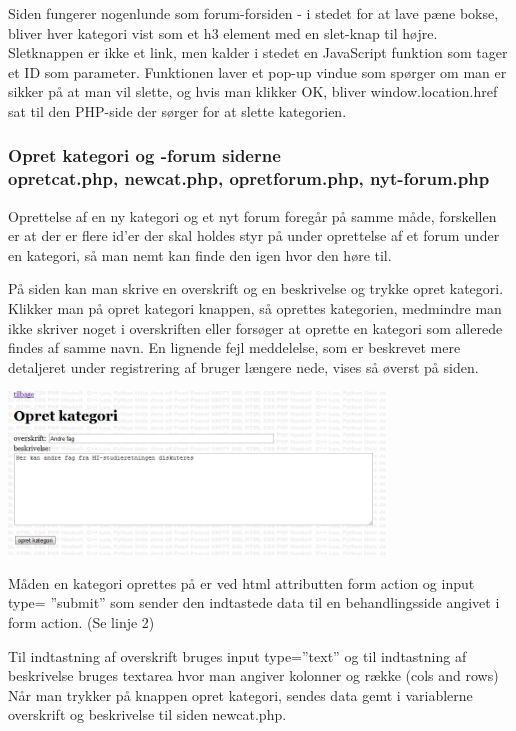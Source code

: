 \documentclass{article}
\begin{document}
Siden fungerer nogenlunde som forum-forsiden - i stedet for at lave pæne bokse, bliver hver kategori vist som et h3 element med en slet-knap til højre. Sletknappen er ikke et link, men kalder i stedet en JavaScript funktion som tager et ID som parameter. Funktionen laver et pop-up vindue som spørger om man er sikker på at man vil slette, og hvis man klikker OK, bliver window.location.href sat til den PHP-side der sørger for at slette kategorien.



\subsubsection[Opret kategori og -forum siderne]{Opret kategori og -forum siderne \\opretcat.php, newcat.php, opretforum.php, nyt-forum.php}
Oprettelse af en ny kategori og et nyt forum foregår på samme måde, forskellen er at der er flere id’er der skal holdes styr på under oprettelse af et forum under en kategori, så man nemt kan finde den igen hvor den høre til.

På siden kan man skrive en overskrift og en beskrivelse og trykke opret kategori. Klikker man på opret kategori knappen, så oprettes kategorien, medmindre man ikke skriver noget i overskriften eller forsøger at oprette en kategori som allerede findes af samme navn. En lignende fejl meddelelse, som er beskrevet mere detaljeret under registrering af bruger længere nede, vises så øverst på siden.

\includegraphics[width=100mm]{mi18.png}

Måden en kategori oprettes på er ved html attributten form action og input type= ”submit” som sender den indtastede data til en behandlingsside angivet i form action. (Se linje 2)



Til indtastning af overskrift bruges input type=”text” og til indtastning af beskrivelse bruges textarea hvor man angiver kolonner og række (cols and rows)
Når man trykker på knappen opret kategori, sendes data gemt i variablerne overskrift og beskrivelse til siden newcat.php.
\end{document}
